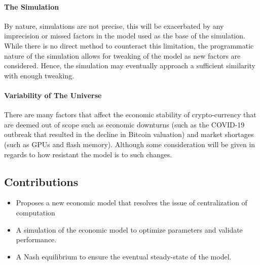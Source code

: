 \paragraph{The Simulation} By nature, simulations are not precise, this will be exacerbated by any imprecision or missed factors in the model used as the base of the simulation. While there is no direct method to counteract this limitation, the programmatic nature of the simulation allows for tweaking of the model as new factors are considered. Hence, the simulation may eventually approach a sufficient similarity with enough tweaking.

\paragraph{Variability of The Universe} There are many factors that affect the economic stability of crypto-currency that are deemed out of scope such as economic downturns (such as the COVID-19 outbreak that resulted in the decline in Bitcoin valuation) and market shortages (such as GPUs and flash memory). Although some consideration will be given in regards to how resistant the model is to such changes.

\subsection{Contributions}

\begin{itemize}
  \item Proposes a new economic model that resolves the issue of centralization of computation
  \item A simulation of the economic model to optimize parameters and validate performance.
  \item A Nash equilibrium to ensure the eventual steady-state of the model.
\end{itemize}
